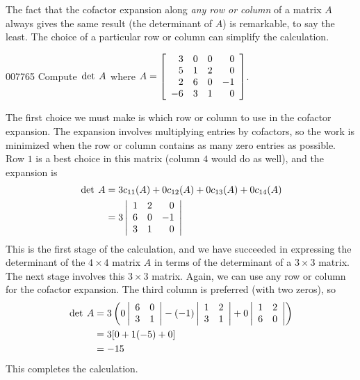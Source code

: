 The fact that the cofactor expansion along \textit{any row or column} of a matrix $A$ always gives the same result (the determinant of $A$) is remarkable, to say the least. The choice of a particular row or column can simplify the calculation.

\begin{example}{}{007765}
Compute $\thinspace\operatorname{det \medspace} A$ where
$A = \left[ \begin{array}{rrrr}
3 & 0 & 0 & 0 \\
5 & 1 & 2 & 0 \\
2 & 6 & 0 & -1 \\
-6 & 3 & 1 & 0 
\end{array}
\right]$.

\begin{solution}
The first choice we must make is which row or column to use in the 
cofactor expansion. The expansion involves multiplying entries by 
cofactors, so the work is minimized when the row or column contains as 
many zero entries as possible. Row $1$ is a best choice in this matrix 
(column $4$ would do as well), and the expansion is
\begin{align*}
\thinspace\operatorname{det \medspace} A &= 3c_{11}(A) + 0c_{12}(A) + 0c_{13}(A) + 0c_{14}(A) \\
&= 3 \left| \begin{array}{rrr}
1 & 2 & 0 \\
6 & 0 & -1 \\
3 & 1 & 0
\end{array}
\right|
\end{align*}
This is the first stage of the calculation, and we have succeeded in expressing the determinant of the $4 \times 4$ matrix $A$
 in terms of the determinant of a $3 \times 3$ matrix. The next stage involves 
this $3 \times 3$ matrix. Again, we can use any row or column for the cofactor 
expansion. The third column is preferred (with two zeros), so
\begin{align*}
\thinspace\operatorname{det \medspace} A &= 3 \left( 0 \left| \begin{array}{rr}
6 & 0 \\
3 & 1 
\end{array}
\right| - (-1)
 \left| \begin{array}{rr}
1 & 2 \\
3 & 1 
\end{array}
\right|
+ 0
 \left| \begin{array}{rr}
1 & 2 \\
6 & 0 
\end{array}
\right|
 \right) \\
&= 3 [ 0 + 1(-5) + 0] \\
&= -15
\end{align*}
This completes the calculation.
\end{solution}
\end{example}

